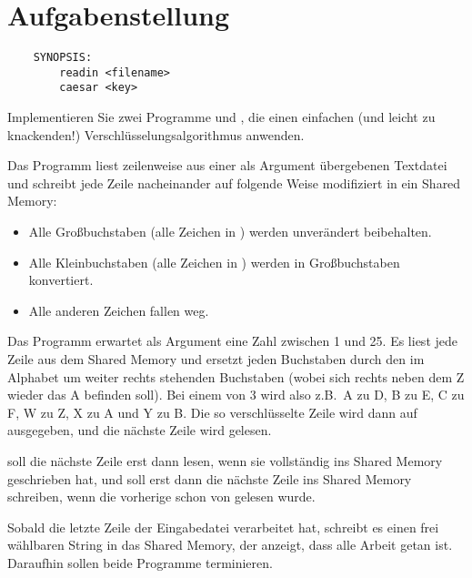 




\section*{Aufgabenstellung}

\begin{verbatim}
    SYNOPSIS:
        readin <filename>
        caesar <key>
\end{verbatim}

Implementieren Sie zwei Programme  und , die
einen einfachen (und leicht zu knackenden!) Verschlüsselungsalgorithmus
anwenden.

Das Programm  liest zeilenweise aus einer als Argument
übergebenen Textdatei und schreibt jede Zeile nacheinander auf folgende Weise
modifiziert in ein Shared Memory:

\begin{itemize}
\item Alle Großbuchstaben (alle Zeichen in \osueregex{[A-Z]}) werden
unverändert beibehalten.
\item Alle Kleinbuchstaben (alle Zeichen in \osueregex{[a-z]}) werden in
Großbuchstaben konvertiert.
\item Alle anderen Zeichen fallen weg.
\end{itemize}

Das Programm  erwartet als Argument eine Zahl zwischen 1
und 25. Es liest jede Zeile aus dem Shared Memory und ersetzt jeden
Buchstaben durch den im Alphabet um  weiter rechts stehenden
Buchstaben (wobei sich rechts neben dem Z wieder das A befinden
soll). Bei einem  von 3 wird also z.B.\ A zu D, B zu E, C zu
F, W zu Z, X zu A und Y zu B. Die so verschlüsselte Zeile wird dann
auf  ausgegeben, und die nächste Zeile wird gelesen.

 soll die nächste Zeile erst dann lesen, wenn 
sie vollständig ins Shared Memory geschrieben hat, und  soll
erst dann die nächste Zeile ins Shared Memory schreiben, wenn die vorherige
schon von  gelesen wurde.

Sobald  die letzte Zeile der Eingabedatei verarbeitet hat,
schreibt es einen frei wählbaren String in das Shared Memory, der
 anzeigt, dass alle Arbeit getan ist. Daraufhin sollen beide
Programme terminieren.

